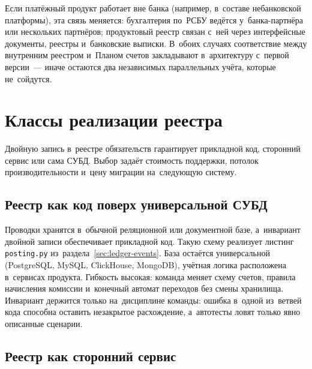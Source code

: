 Если платёжный продукт работает вне банка (например, в~составе небанковской
платформы), эта связь меняется: бухгалтерия по~РСБУ ведётся у~банка-партнёра или
нескольких партнёров; продуктовый реестр связан с~ней через интерфейсные
документы, реестры и~банковские выписки. В~обоих случаях соответствие между
внутренним реестром и~Планом счетов закладывают в~архитектуру с~первой
версии~--- иначе остаются два независимых параллельных учёта, которые
не~сойдутся.

\section{Классы реализации реестра}\label{sec:ledger-implementation-classes}

Двойную запись в~реестре обязательств гарантирует прикладной код, сторонний
сервис или сама СУБД. Выбор задаёт стоимость поддержки, потолок
производительности и~цену миграции на~следующую систему.

\subsection*{Реестр как код поверх универсальной СУБД}

Проводки хранятся в~обычной реляционной или документной базе, а~инвариант
двойной записи обеспечивает прикладной код. Такую схему реализует листинг
\texttt{posting.py} из~раздела~\ref{sec:ledger-events}. База остаётся
универсальной (PostgreSQL, MySQL, ClickHouse, MongoDB), учётная логика
расположена в~сервисах продукта. Гибкость высокая: команда меняет схему счетов,
правила начисления комиссии и~конечный автомат переходов без смены хранилища.
Инвариант держится только на~дисциплине команды: ошибка в~одной из~ветвей кода способна оставить
незакрытое расхождение, а~автотесты ловят только явно описанные сценарии.

\subsection*{Реестр как сторонний сервис}


